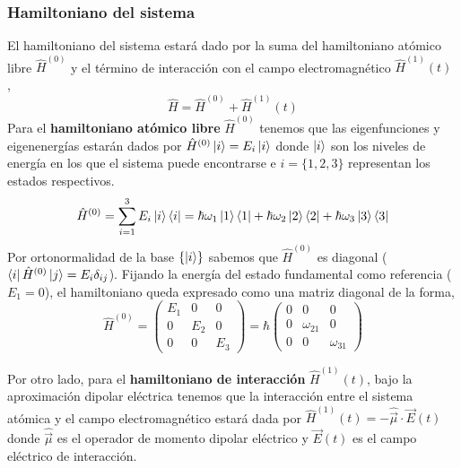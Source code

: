 \subsubsection*{Hamiltoniano del sistema}
El hamiltoniano del sistema estará dado por la suma del hamiltoniano atómico libre $\hat{H}^{(0)}$ y el término de interacción con el campo electromagnético $\hat{H}^{(1)}(t)$ \cite{gerryIntroductoryQuantumOpticsa, fleischhauerElectromagneticallyInducedTransparency2005},
\begin{equation}
\hat{H} = \hat{H}^{(0)} + \hat{H}^{(1)}(t)
\end{equation}
Para el \textbf{hamiltoniano atómico libre} $\hat{H}^{(0)}$ tenemos que las eigenfunciones y eigenenergías estarán dados por $\hat{H}^{(0)} \ket{i} = E_i \ket{i}$ donde $\ket{i}$ son los niveles de energía en los que el sistema puede encontrarse e $i = \{1, 2, 3\}$ representan los estados respectivos.
\begin{equation}
\hat{H}^{(0)} = \sum_{i=1}^{3} E_i \ket{i}\bra{i} = \hbar \omega_1 \ket{1}\bra{1} + \hbar \omega_2 \ket{2}\bra{2} + \hbar \omega_3 \ket{3}\bra{3}
\end{equation}
Por ortonormalidad de la base $\{\ket{i}\}$ sabemos que $\hat{H}^{(0)}$ es diagonal ($\bra{i} \hat{H}^{(0)} \ket{j} = E_i \delta_{ij}$). Fijando la energía del estado fundamental como referencia ($E_1 = 0$), el hamiltoniano queda expresado como una matriz diagonal de la forma,
\begin{equation}
\hat{H}^{(0)} = \begin{pmatrix}
E_1 &  0 & 0 \\
0 & E_2 & 0 \\
0 & 0 & E_3
\end{pmatrix} = \hbar \begin{pmatrix}
    0 & 0 & 0 \\
    0 & \omega_{21} & 0 \\
    0 &  0 & \omega_{31}
\end{pmatrix}
\end{equation}

Por otro lado, para el \textbf{hamiltoniano de interacción} $\hat{H}^{(1)}(t)$, bajo la aproximación dipolar eléctrica \cite{robertw.boydNonlinearOptics,steckQuantumAtomOptics2007} tenemos que la interacción entre el sistema atómica y el campo electromagnético estará dada por $\hat{H}^{(1)}(t) = - \hat{\vec{\mu}} \cdot \vec{E}(t)$ donde $\hat{\vec{\mu}}$ es el operador de momento dipolar eléctrico y $\vec{E}(t)$ es el campo eléctrico de interacción.

